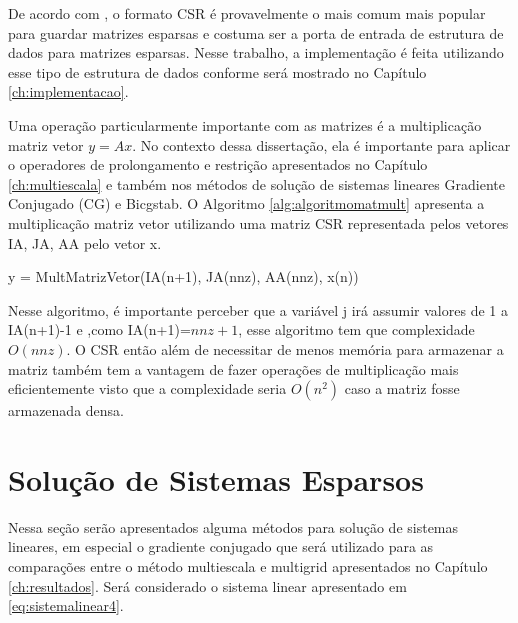 De acordo com \citet{solverlinear}, o formato CSR é provavelmente o mais comum mais popular para guardar matrizes esparsas e costuma ser a porta de entrada de estrutura de dados para matrizes esparsas. Nesse trabalho, a implementação é feita utilizando esse tipo de estrutura de dados conforme será mostrado no Capítulo \ref{ch:implementacao}.

Uma operação particularmente importante com as matrizes é a multiplicação matriz vetor $y = Ax$. No contexto dessa dissertação, ela é importante para aplicar o operadores de prolongamento e restrição apresentados no Capítulo \ref{ch:multiescala} e também nos métodos de solução de sistemas lineares Gradiente Conjugado (CG) e Bicgstab. O Algoritmo \ref{alg:algoritmomatmult} apresenta a multiplicação matriz vetor utilizando uma matriz CSR representada pelos vetores IA, JA, AA pelo vetor x.


\vspace{1cm}
\begin{algorithm}[H]
\caption{y = MultMatrizVetor(IA(n+1), JA(nnz), AA(nnz), x(n))}
\label{alg:algoritmomatmult}

\end{algorithm}
\vspace{1cm}


Nesse algoritmo, é importante perceber que a variável j irá assumir valores de 1 a IA(n+1)-1 e ,como IA(n+1)=$nnz + 1$, esse algoritmo tem que complexidade $O(nnz)$. 
O CSR então além de necessitar de menos memória para armazenar a matriz também tem a vantagem de fazer operações de multiplicação mais eficientemente visto que a complexidade seria $O(n^2)$ caso a matriz fosse armazenada densa.


\section{Solução de Sistemas Esparsos} \label{sec:cg}

Nessa seção serão apresentados alguma métodos para solução de sistemas lineares, em especial o gradiente conjugado que será utilizado para as comparações entre o método multiescala e multigrid apresentados no Capítulo \ref{ch:resultados}. Será considerado o sistema linear apresentado em \eqref{eq:sistemalinear4}.

